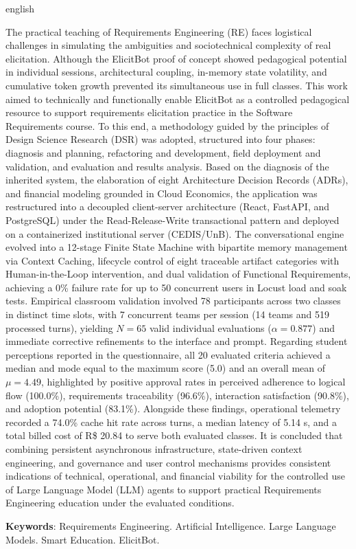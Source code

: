 \begin{resumo}[Abstract]
\begin{otherlanguage*}{english}

The practical teaching of Requirements Engineering (RE) faces logistical challenges in simulating the ambiguities and sociotechnical complexity of real elicitation. Although the ElicitBot proof of concept showed pedagogical potential in individual sessions, architectural coupling, in-memory state volatility, and cumulative token growth prevented its simultaneous use in full classes. This work aimed to technically and functionally enable ElicitBot as a controlled pedagogical resource to support requirements elicitation practice in the Software Requirements course. To this end, a methodology guided by the principles of Design Science Research (DSR) was adopted, structured into four phases: diagnosis and planning, refactoring and development, field deployment and validation, and evaluation and results analysis. Based on the diagnosis of the inherited system, the elaboration of eight Architecture Decision Records (ADRs), and financial modeling grounded in Cloud Economics, the application was restructured into a decoupled client-server architecture (React, FastAPI, and PostgreSQL) under the Read-Release-Write transactional pattern and deployed on a containerized institutional server (CEDIS/UnB). The conversational engine evolved into a 12-stage Finite State Machine with bipartite memory management via Context Caching, lifecycle control of eight traceable artifact categories with Human-in-the-Loop intervention, and dual validation of Functional Requirements, achieving a 0\% failure rate for up to 50 concurrent users in Locust load and soak tests. Empirical classroom validation involved 78 participants across two classes in distinct time slots, with 7 concurrent teams per session (14 teams and 519 processed turns), yielding $N = 65$ valid individual evaluations ($\alpha = 0.877$) and immediate corrective refinements to the interface and prompt. Regarding student perceptions reported in the questionnaire, all 20 evaluated criteria achieved a median and mode equal to the maximum score (5.0) and an overall mean of $\mu = 4.49$, highlighted by positive approval rates in perceived adherence to logical flow (100.0\%), requirements traceability (96.6\%), interaction satisfaction (90.8\%), and adoption potential (83.1\%). Alongside these findings, operational telemetry recorded a 74.0\% cache hit rate across turns, a median latency of 5.14 s, and a total billed cost of R\$ 20.84 to serve both evaluated classes. It is concluded that combining persistent asynchronous infrastructure, state-driven context engineering, and governance and user control mechanisms provides consistent indications of technical, operational, and financial viability for the controlled use of Large Language Model (LLM) agents to support practical Requirements Engineering education under the evaluated conditions.

\vspace{\onelineskip}
\noindent
\textbf{Keywords}: Requirements Engineering. Artificial Intelligence. Large Language Models. Smart Education. ElicitBot.
\end{otherlanguage*}
\end{resumo}
